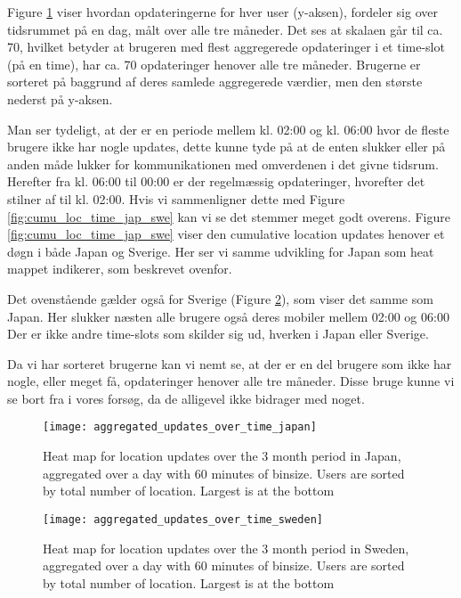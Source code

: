Figure \ref{fig:agg_heatmap_jap} viser hvordan opdateringerne for hver user (y-aksen), fordeler sig over tidsrummet på en dag, målt over alle tre måneder. Det ses at skalaen går til ca. 70, hvilket betyder at brugeren med flest aggregerede opdateringer i et time-slot (på en time), har ca. 70 opdateringer henover alle tre måneder. Brugerne er sorteret på baggrund af deres samlede aggregerede værdier, men den største nederst på y-aksen. 

Man ser tydeligt, at der er en periode mellem kl. 02:00 og kl. 06:00 hvor de fleste brugere ikke har nogle updates, dette kunne tyde på at de enten slukker eller på anden måde lukker for kommunikationen med omverdenen i det givne tidsrum. Herefter fra kl. 06:00 til 00:00 er der regelmæssig opdateringer, hvorefter det stilner af til kl. 02:00. Hvis vi sammenligner dette med Figure \ref{fig:cumu_loc_time_jap_swe} kan vi se det stemmer meget godt overens. Figure \ref{fig:cumu_loc_time_jap_swe} viser den cumulative location updates henover et døgn i både Japan og Sverige. Her ser vi samme udvikling for Japan som heat mappet indikerer, som beskrevet ovenfor. 

Det ovenstående gælder også for Sverige (Figure \ref{fig:agg_heatmap_swe}), som viser det samme som Japan. Her slukker næsten alle brugere også deres mobiler mellem 02:00 og 06:00
Der er ikke andre time-slots som skilder sig ud, hverken i Japan eller Sverige. 

Da vi har sorteret brugerne kan vi nemt se, at der er en del brugere som ikke har nogle, eller meget få, opdateringer henover alle tre måneder. Disse bruge kunne vi se bort fra i vores forsøg, da de alligevel ikke bidrager med noget. 

\begin{figure}[H]
    \hspace*{-0.8cm}
    \centering
    \texttt{[image: aggregated\_updates\_over\_time\_japan]}
    \caption{Heat map for location updates over the 3 month period in Japan, aggregated over a day with 60 minutes of binsize. Users are sorted by total number of location. Largest is at the bottom}
    \label{fig:agg_heatmap_jap}
\end{figure}
\begin{figure}[H]
    \hspace*{-0.8cm}
    \centering
    \texttt{[image: aggregated\_updates\_over\_time\_sweden]}
    \caption{Heat map for location updates over the 3 month period in Sweden, aggregated over a day with 60 minutes of binsize. Users are sorted by total number of location. Largest is at the bottom}
    \label{fig:agg_heatmap_swe}
\end{figure}

